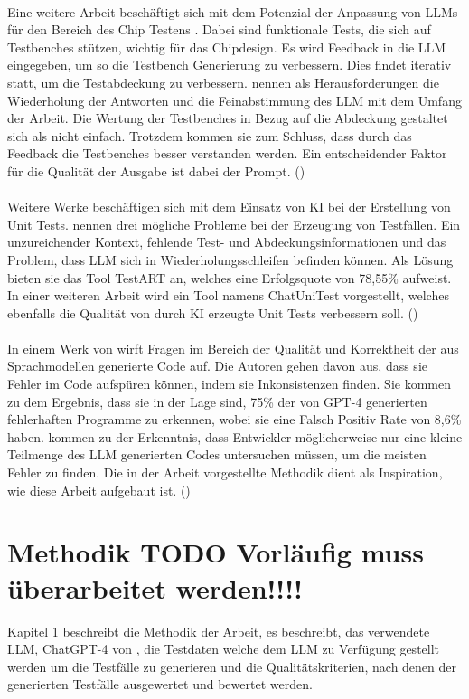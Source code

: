 \documentclass[12pt,toc=bib,toc=listof]{scrreprt}
\begin{document}
\\
Eine weitere Arbeit beschäftigt sich mit dem Potenzial der Anpassung von LLMs für den Bereich des Chip Testens \textcite{Bhandari2024}. Dabei sind funktionale Tests, die sich auf Testbenches stützen, wichtig für das Chipdesign. Es wird Feedback in die LLM eingegeben, um so die Testbench Generierung zu verbessern. Dies findet iterativ statt, um die Testabdeckung zu verbessern. \textcite{Bhandari2024} nennen als Herausforderungen die Wiederholung der Antworten und die Feinabstimmung des LLM mit dem Umfang der Arbeit. Die Wertung der Testbenches in Bezug auf die Abdeckung gestaltet sich als nicht einfach. Trotzdem kommen sie zum Schluss, dass durch das Feedback die Testbenches besser verstanden werden. Ein entscheidender Faktor für die Qualität der Ausgabe ist dabei der Prompt. (\cite{Bhandari2024})\\
\\
Weitere Werke beschäftigen sich mit dem Einsatz von KI bei der Erstellung von Unit Tests. \textcite{Gu2024} nennen drei mögliche Probleme bei der Erzeugung von Testfällen. Ein unzureichender Kontext, fehlende Test- und Abdeckungsinformationen und das Problem, dass LLM sich in Wiederholungsschleifen befinden können. Als Lösung bieten sie das Tool TestART an, welches eine Erfolgsquote von 78,55\% aufweist. In einer weiteren Arbeit wird ein Tool namens ChatUniTest vorgestellt, welches ebenfalls die Qualität von durch KI erzeugte Unit Tests verbessern soll. (\cite{Chen2024})\\
\\
In einem Werk von \textcite{Wang2024} wirft Fragen im Bereich der Qualität und Korrektheit der aus Sprachmodellen generierte Code auf. Die Autoren
\textcite{Wang2024}  gehen davon aus, dass sie Fehler im Code aufspüren können, indem sie Inkonsistenzen finden. Sie kommen zu dem Ergebnis, dass sie in der Lage sind, 75\% der von GPT-4 generierten fehlerhaften Programme zu erkennen, wobei sie eine Falsch Positiv Rate von 8,6\% haben. \textcite{Wang2024} kommen zu der Erkenntnis, dass Entwickler möglicherweise nur eine kleine Teilmenge des LLM generierten Codes untersuchen müssen, um die meisten Fehler zu finden. Die in der Arbeit vorgestellte Methodik dient als Inspiration, wie diese Arbeit aufgebaut ist. (\cite{Wang2024})

\chapter{Methodik TODO Vorläufig muss überarbeitet werden!!!!} %
\label{sec:methodik}
Kapitel \ref{sec:methodik} beschreibt die Methodik der Arbeit, es beschreibt, das verwendete LLM, ChatGPT-4 von \textcite{OpenAI2025}, die Testdaten welche dem LLM zu Verfügung gestellt werden um die Testfälle zu generieren und die Qualitätskriterien, nach denen der generierten Testfälle ausgewertet und bewertet werden.
\end{document}
